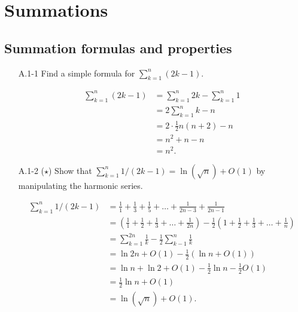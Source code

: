 \chapter{Summations}

\section{Summation formulas and properties}

\begin{enumerate}

\item[A.1{-}1] {Find a simple formula for $\sum_{k = 1}^{n} (2k - 1)$.}

\begin{framed}
\begin{equation*}
\begin{aligned}
  \sum_{k = 1}^{n} (2k - 1) &= \sum_{k = 1}^{n} 2k - \sum_{k = 1}^{n} 1\\
                            &= 2 \sum_{k = 1}^{n} k - n\\
                            &= 2 \cdot \frac{1}{2} n (n + 2) - n\\
                            &= n^2 + n - n\\
                            &= n^2.
\end{aligned}
\end{equation*}
\end{framed}

\item[A.1{-}2] {($\star$) Show that
$\sum_{k = 1}^{n} 1/(2k - 1) = \ln(\sqrt n) + O(1)$ by manipulating the harmonic
series.}

\begin{framed}
\begin{equation*}
\begin{aligned}
  \sum_{k = 1}^{n} 1/(2k - 1) &= \frac{1}{1} + \frac{1}{3} + \frac{1}{5} + \dots + \frac{1}{2n - 3} + \frac{1}{2n - 1}\\
                              &= \left(\frac{1}{1} + \frac{1}{2} + \frac{1}{3} + \dots + \frac{1}{2n}\right)
                              - \frac{1}{2} \left(1 + \frac{1}{2} + \frac{1}{3} + \dots + \frac{1}{n}\right)\\
                              &= \sum_{k = 1}^{2n} \frac{1}{k} - \frac{1}{2} \sum_{k - 1}^{n} \frac{1}{k}\\
                              &= \ln{2n} + O(1) - \frac{1}{2} (\ln n + O(1))\\
                              &= \ln n + \ln 2 + O(1) - \frac{1}{2} \ln n - \frac{1}{2} O(1)\\
                              &= \frac{1}{2} \ln n + O(1)\\
                              &= \ln(\sqrt n) + O(1).
\end{aligned}
\end{equation*}
\end{framed}


\end{enumerate}

